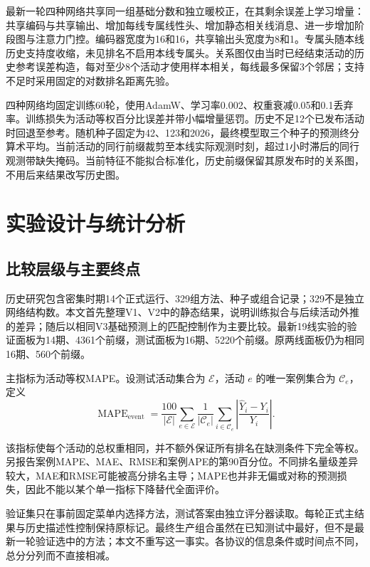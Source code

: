 \documentclass[a4paper,11pt,fontset=none]{ctexart}
\begin{document}
最新一轮四种网络共享同一组基础分数和独立暖校正，在其剩余误差上学习增量：共享编码与共享输出、增加每线专属线性头、增加静态相关线消息、进一步增加阶段图与注意力门控。编码器宽度为16和16，共享输出头宽度为8和1。专属头随本线历史支持度收缩，未见排名不启用本线专属头。关系图仅由当时已经结束活动的历史参考误差构造，每对至少8个活动才使用样本相关，每线最多保留3个邻居；支持不足时采用固定的对数排名距离先验。

四种网络均固定训练60轮，使用AdamW、学习率0.002、权重衰减0.05和0.1丢弃率。训练损失为活动等权百分比误差并带小幅增量惩罚。历史不足12个已发布活动时回退至参考。随机种子固定为42、123和2026，最终模型取三个种子的预测终分算术平均。当前活动的同行前缀裁剪至本线实际观测时刻，超过1小时滞后的同行观测带缺失掩码。当前特征不能拟合标准化，历史前缀保留其原发布时的关系图，不用后来结果改写历史图。

\section{实验设计与统计分析}

\subsection{比较层级与主要终点}

历史研究包含密集时期14个正式运行、329组方法、种子或组合记录；329不是独立网络结构数。本文首先整理V1、V2中的静态结果，说明训练拟合与后续活动外推的差异；随后以相同V3基础预测上的匹配控制作为主要比较。最新19线实验的验证面板为14期、4361个前缀，测试面板为16期、5220个前缀。原两线面板仍为相同16期、560个前缀。

主指标为活动等权MAPE。设测试活动集合为 \(\mathcal E\)，活动 \(e\) 的唯一案例集合为 \(\mathcal C_e\)，定义
\begin{equation}\label{eq:metric}
\operatorname{MAPE}_{\mathrm{event}}=
\frac{100}{|\mathcal E|}\sum_{e\in\mathcal E}
\frac{1}{|\mathcal C_e|}\sum_{i\in\mathcal C_e}
\left|\frac{\widehat Y_i-Y_i}{Y_i}\right|.
\end{equation}

该指标使每个活动的总权重相同，并不额外保证所有排名在缺测条件下完全等权。另报告案例MAPE、MAE、RMSE和案例APE的第90百分位。不同排名量级差异较大，MAE和RMSE可能被高分排名主导；MAPE也并非无偏或对称的预测损失\citep{hyndman2006metrics,demyttenaere2016mape}，因此不能以某个单一指标下降替代全面评价。

验证集只在事前固定菜单内选择方法，测试答案由独立评分器读取。每轮正式主结果与历史描述性控制保持原标记。最终生产组合虽然在已知测试中最好，但不是最新一轮验证选中的方法；本文不重写这一事实。各协议的信息条件或时间点不同，总分分列而不直接相减。
\end{document}
